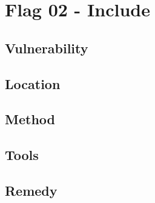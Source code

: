 \section{Flag 02 - Include}

\begin{center}
\end{center}

\subsection{Vulnerability}

\subsection{Location}

\subsection{Method}

\subsection{Tools}

\subsection{Remedy}